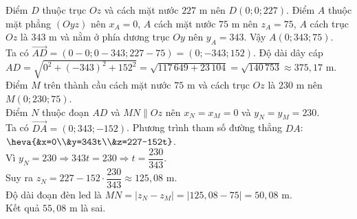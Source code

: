 \begin{ex}
{\begin{center}
		\end{center}
		\begin{itemchoice}
			\itemch Điểm $D$ thuộc trục $Oz$ và cách mặt nước $227$ m nên $D(0;0;227)$.
			\itemch Điểm $A$ thuộc mặt phẳng $(Oyz)$ nên $x_A=0$, $A$ cách mặt nước $75$ m nên $z_A=75$, $A$ cách trục $Oz$ là $343$ m và nằm ở phía dương trục $Oy$ nên $y_A=343$. Vậy $A(0;343;75)$.\\
			Ta có $\overrightarrow{AD} = (0-0; 0-343; 227-75) = (0; -343; 152)$.
			\itemch Độ dài dây cáp $AD = \sqrt{0^2 + (-343)^2 + 152^2} = \sqrt{117\,649 + 23\,104} = \sqrt{140\,753} \approx 375{,}17$ m.
			\itemch Điểm $M$ trên thành cầu cách mặt nước $75$ m và cách trục $Oz$ là $230$ m nên $M(0; 230; 75)$.\\
			Điểm $N$ thuộc đoạn $AD$ và $MN \parallel Oz$ nên $x_N=x_M=0$ và $y_N=y_M=230$.\\
			Ta có $\overrightarrow{DA} = (0; 343; -152)$. Phương trình tham số đường thẳng $DA$: $\heva{&x=0\\&y=343t\\&z=227-152t}$.\\
			Vì $y_N=230 \Rightarrow 343t=230 \Rightarrow t=\dfrac{230}{343}$.\\
			Suy ra $z_N = 227 - 152 \cdot \dfrac{230}{343} \approx 125{,}08$ m.\\
			Độ dài đoạn đèn led là $MN = |z_N - z_M| = |125{,}08 - 75| = 50{,}08$ m.\\
			Kết quả $55{,}08$ m là sai.
		\end{itemchoice}
	}
\end{ex}

